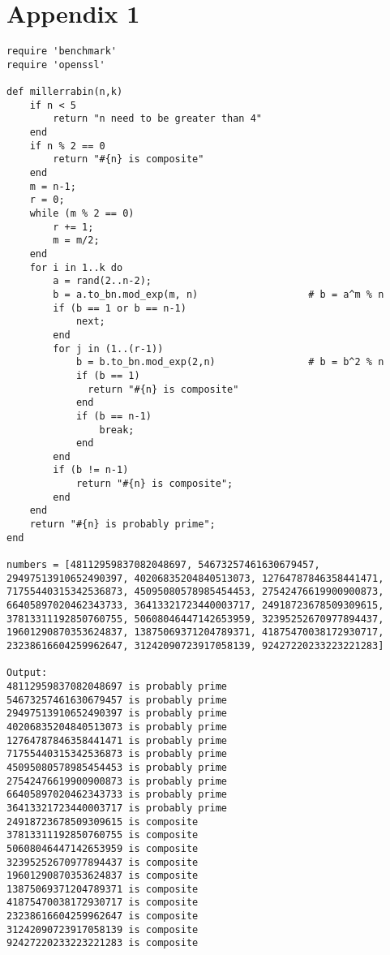 \documentclass[12pt]{article}
\begin{document}
\section*{Appendix 1} \label{App:App1}
\begin{verbatim}
require 'benchmark'
require 'openssl'
 
def millerrabin(n,k)
    if n < 5
        return "n need to be greater than 4"
    end
    if n % 2 == 0
        return "#{n} is composite"
    end
    m = n-1;
    r = 0;
    while (m % 2 == 0)
        r += 1;
        m = m/2;
    end
    for i in 1..k do
        a = rand(2..n-2);
        b = a.to_bn.mod_exp(m, n)                   # b = a^m % n
        if (b == 1 or b == n-1)
            next;
        end
        for j in (1..(r-1))
            b = b.to_bn.mod_exp(2,n)                # b = b^2 % n
            if (b == 1)
              return "#{n} is composite"
            end
            if (b == n-1)
                break;
            end
        end
        if (b != n-1)
            return "#{n} is composite";
        end
    end
    return "#{n} is probably prime";
end
 
numbers = [48112959837082048697, 54673257461630679457,
29497513910652490397, 40206835204840513073, 12764787846358441471,
71755440315342536873, 45095080578985454453, 27542476619900900873,
66405897020462343733, 36413321723440003717, 24918723678509309615,
37813311192850760755, 50608046447142653959, 32395252670977894437,
19601290870353624837, 13875069371204789371, 41875470038172930717,
23238616604259962647, 31242090723917058139, 92427220233223221283]

Output:
48112959837082048697 is probably prime
54673257461630679457 is probably prime
29497513910652490397 is probably prime
40206835204840513073 is probably prime
12764787846358441471 is probably prime
71755440315342536873 is probably prime
45095080578985454453 is probably prime
27542476619900900873 is probably prime
66405897020462343733 is probably prime
36413321723440003717 is probably prime
24918723678509309615 is composite
37813311192850760755 is composite
50608046447142653959 is composite
32395252670977894437 is composite
19601290870353624837 is composite
13875069371204789371 is composite
41875470038172930717 is composite
23238616604259962647 is composite
31242090723917058139 is composite
92427220233223221283 is composite
\end{verbatim}
\end{document}
